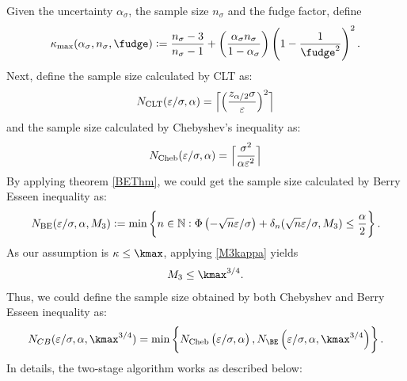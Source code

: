 \documentclass{iitthesis}
\begin{document}
Given the uncertainty $\alpha_{\sigma}$, the sample size $n_{\sigma}$ and the fudge factor, define
\begin{equation}
\label{kappamaxdef}
\kappa_{\max} (\alpha_\sigma, n_{\sigma},\fudge):= \frac{n_{\sigma}-3}{n_{\sigma}-1} + \left(\frac{ \alpha_\sigma n_{\sigma}}{1-\alpha_\sigma}\right) \left(1 - \frac{1}{\fudge^2}\right)^2.
\end{equation}
Next, define the sample size calculated by CLT as:
\begin{equation}\label{NCLT}
N_{\mathrm{CLT}}(\varepsilon/\sigma,\alpha)
= 
\Bigl\lceil
\Bigl(
\frac{z_{\alpha/2}\sigma}{\varepsilon}
\Bigr)^2
\Bigr\rceil
\end{equation}
and the sample size calculated by Chebyshev's inequality as:
\begin{equation}\label{NCheby}
N_{\text{Cheb}}(\varepsilon/\sigma,\alpha)
= 
\Bigl\lceil\frac{\sigma^2}{\alpha\varepsilon^2}\Bigr\rceil
\end{equation}
By applying theorem \ref{BEThm}, we could get the sample size calculated by Berry Esseen inequality as:
\begin{equation}\label{NBE}
N_{\text{BE}}(\varepsilon/\sigma,\alpha,M_3) := \min \left \{ n \in \mathbb{N} : \Phi\left(-\sqrt{n}\varepsilon/\sigma  \right)+\delta_n(\sqrt{n}\varepsilon/\sigma,M_3)
\le \frac{\alpha}{2} \right \}.
\end{equation}
As our assumption is $\kappa \leq \kmax$, applying \eqref{M3kappa} yields 
\begin{align}\label{M3kmax}
M_3 \leq \kmax^{3/4}.
\end{align}
Thus, we could define the sample size obtained by both Chebyshev and Berry Esseen inequality as:
\begin{align}\label{NCB}
N_{CB} (\varepsilon/\sigma,\alpha, \kmax^{3/4})  = \min \left \{ N_{\Cheb}\left(\varepsilon/\sigma,\alpha\right),N_{\BE}\left(\varepsilon/\sigma,\alpha, \kmax^{3/4}\right)\right \}.
\end{align}
In details, the two-stage algorithm works as described below:
\end{document}
